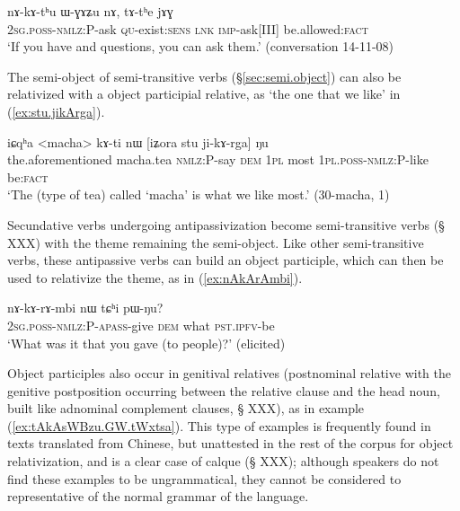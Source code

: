 \begin{exe}
\ex \label{ex:nAkAthu.WGAZu}
\gll nɤ-kɤ-tʰu ɯ-ɣɤʑu nɤ, tɤ-tʰe jɤɣ \\
\textsc{2sg}.\textsc{poss}-\textsc{nmlz}:P-ask \textsc{qu}-exist:\textsc{sens} \textsc{lnk} \textsc{imp}-ask[III] be.allowed:\textsc{fact} \\
\glt `If you have and questions, you can ask them.' (conversation 14-11-08)
\end{exe}

The semi-object of semi-transitive verbs (§\ref{sec:semi.object}) can also be relativized with a object participial relative, as  `the one that we like' in (\ref{ex:stu.jikArga}).

\begin{exe}
\ex \label{ex:stu.jikArga}
\gll  iɕqʰa <macha> kɤ-ti nɯ [iʑora stu ji-kɤ-rga] ŋu \\
the.aforementioned macha.tea \textsc{nmlz}:P-say \textsc{dem} \textsc{1pl} most \textsc{1pl}.\textsc{poss}-\textsc{nmlz}:P-like be:\textsc{fact} \\
\glt `The (type of tea) called `macha' is what we like most.' (30-macha, 1)
\end{exe}

Secundative verbs undergoing antipassivization become semi-transitive verbs (§ XXX) with the theme remaining the semi-object. Like other semi-transitive verbs, these antipassive verbs can build an object participle, which can then be used to relativize the theme, as in (\ref{ex:nAkArAmbi}).

\begin{exe}
\ex \label{ex:nAkArAmbi}
\gll  nɤ-kɤ-rɤ-mbi nɯ tɕʰi pɯ-ŋu? \\
\textsc{2sg}.\textsc{poss}-\textsc{nmlz}:P-\textsc{apass}-give \textsc{dem} what \textsc{pst}.\textsc{ipfv}-be \\
\glt `What was it that you gave (to people)?' (elicited)
\end{exe}

Object participles also occur in genitival relatives (postnominal relative with the genitive postposition  occurring between the relative clause and the head noun, built like adnominal complement clauses, § XXX), as in example (\ref{ex:tAkAsWBzu.GW.tWxtsa}). This type of examples is frequently found in texts translated from Chinese, but unattested in the rest of the corpus for object relativization, and is a clear case of calque (§ XXX); although speakers do not find these examples to be ungrammatical, they cannot be considered to representative of the normal grammar of the language.


